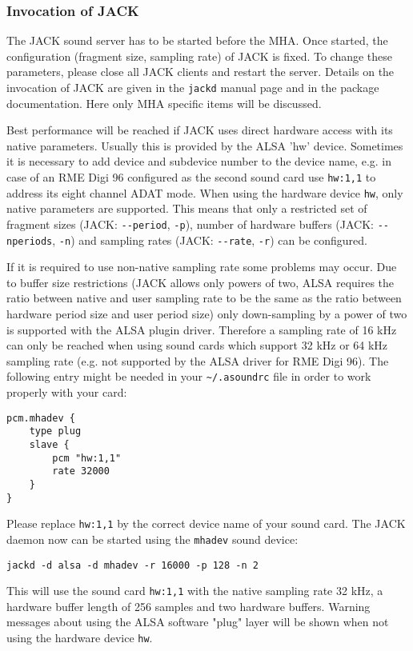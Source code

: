 \subsubsection{Invocation of JACK}

The JACK sound server has to be started before the MHA. Once
started, the configuration (fragment size, sampling rate) of JACK is fixed. To
change these parameters, please close all JACK clients and restart the server.
Details on the invocation of JACK are given in the \verb!jackd!  manual page
and in the package documentation. Here only MHA specific items will be
discussed.

Best performance will be reached if JACK uses direct hardware access
with its native parameters. Usually this is provided by the ALSA 'hw'
device. Sometimes it is necessary to add device and subdevice number
to the device name, e.g. in case of an RME Digi 96 configured as the
second sound card use \verb!hw:1,1! to address its eight channel ADAT
mode. When using the hardware device \verb!hw!, only native parameters
are supported. This means that only a restricted set of fragment sizes
(JACK: \verb!--period!, \verb!-p!), number of hardware buffers (JACK:
\verb!--nperiods!, \verb!-n!) and sampling rates (JACK: \verb!--rate!,
\verb!-r!)  can be configured.

If it is required to use non-native sampling rate some problems may
occur. Due to buffer size restrictions (JACK allows only powers of
two, ALSA requires the ratio between native and user sampling rate to be
the same as the ratio between hardware period size and user period
size) only down-sampling by a power of two is supported with the ALSA
plugin driver. Therefore a sampling rate of 16 kHz can only be reached
when using sound cards which support 32 kHz or 64 kHz sampling rate
(e.g. not supported by the ALSA driver for RME Digi 96). The following
entry might be needed in your \verb!~/.asoundrc! file in order to
work properly with your card:
\begin{verbatim}
pcm.mhadev {
    type plug
    slave {
        pcm "hw:1,1"
        rate 32000
    }
}
\end{verbatim}
Please replace \verb!hw:1,1! by the correct device name of your sound
card. The JACK daemon now can be started using the \verb!mhadev! sound
device:
\begin{verbatim}
jackd -d alsa -d mhadev -r 16000 -p 128 -n 2
\end{verbatim}
This will use the sound card \verb!hw:1,1! with the native sampling
rate 32 kHz, a hardware buffer length of 256 samples and two hardware
buffers. Warning messages about using the ALSA software "plug" layer 
will be shown when not using the hardware device \verb!hw!.

